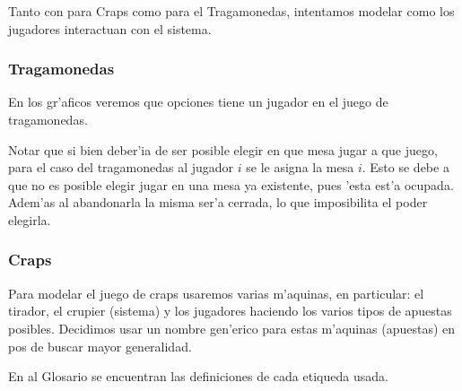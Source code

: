 
\newcommand{\ronda}{ \italica{ FSM Ronda} }
\newcommand{\crupier}{ \italica{ FSM Crupier} }
\newcommand{\tirador}{ \italica{ FSM tirador i} }
\newcommand{\unaRonda}{\italica{FSM Jugador i haciendo apuestas de \textbf{una ronda}}}
\newcommand{\muchasRondas}{\italica{FSM Jugador i haciendo apuestas en\textbf{ m'as de una ronda}}}
\newcommand{\unTiro}{\italica{FSM Jugador i haciendo apuestas de \textbf{un tiro}}}
Tanto con para Craps como para el Tragamonedas, intentamos modelar como los jugadores interactuan con el sistema.

\subsubsection{Tragamonedas}

En los gr'aficos veremos que opciones tiene un jugador en el juego de tragamonedas.

Notar que si bien deber'ia de ser posible elegir en que mesa jugar a que juego, para el caso del tragamonedas al jugador $i$ se le asigna la mesa $i$. Esto se debe a que no es posible elegir jugar en una mesa ya existente, pues 'esta est'a ocupada. Adem'as al abandonarla la misma ser'a cerrada, lo que imposibilita el poder elegirla.

\clearpage


\subsubsection{Craps}
Para modelar el juego de craps usaremos varias m'aquinas, en particular:
el tirador, el crupier (sistema) y los jugadores haciendo los varios tipos de apuestas
posibles. Decidimos usar un nombre gen'erico para estas m'aquinas (apuestas) en pos de buscar mayor generalidad.

En al Glosario se encuentran las definiciones de cada etiqueda usada.


